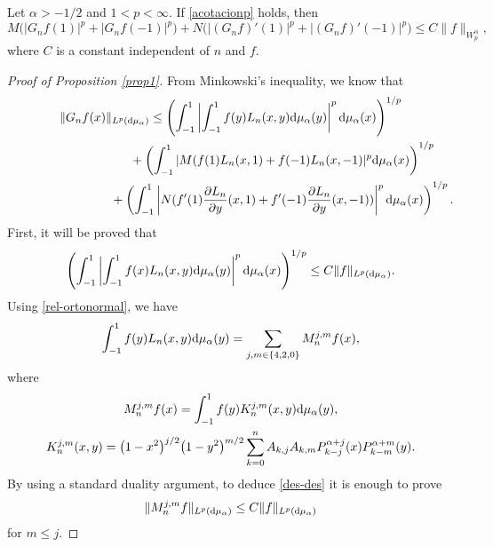 \begin{propo}\label{prop2} Let $\alpha>-1/2$ and $1<p<\infty$. If \eqref{acotacionp} holds, then
	\begin{equation*}
M\big(|G_nf(1)|^p+|G_nf(-1)|^p\big)+N\big(|(G_nf)'(1)|^p+|(G_nf)'(-1)|^p\big)\le C\|f\|_{W_p^{\alpha}},
	\end{equation*}
where $C$ is a constant independent of $n$ and $f$.
\end{propo}

\begin{proof}[Proof of Proposition \ref{prop1}] From Minkowski's inequality, we know that
	\begin{gather*}
	\|G_nf(x)\|_{L^p({\rm d}\mu_{\alpha})}\le
	\left(\int_{-1}^{1}\left|\int_{-1}^{1}f(y)L_n(x,y) {\rm d}{\mu_{\alpha}}(y)\right|^p {\rm d}\mu_{\alpha}(x)\right)^{1/p}\\
\hphantom{\|G_nf(x)\|_{L^p({\rm d}\mu_{\alpha})}\le}{}	+\left(\int_{-1}^{1}|M(f(1)L_n(x,1)+f(-1)L_n(x,-1)|^p {\rm d}\mu_{\alpha}(x)\right)^{1/p}\\
\hphantom{\|G_nf(x)\|_{L^p({\rm d}\mu_{\alpha})}\le}{}	+\left(\int_{-1}^{1}\left|N(f'(1)\frac{\partial L_n}{\partial y}(x,1)+f'(-1)\frac{\partial L_n}{\partial y}(x,-1))\right|^p {\rm d}\mu_{\alpha}(x)\right)^{1/p}.
	\end{gather*}	
First, it will be proved that
\begin{gather}\label{des-des}
\left(\int_{-1}^{1}\left|\int_{-1}^{1}f(x)L_n(x,y) {\rm d}\mu_{\alpha}(y)\right|^p {\rm d}\mu_{\alpha}(x)\right)^{1/p}\le C\|f\|_{L^p({\rm d}\mu_{\alpha})}.
	\end{gather}
Using \eqref{rel-ortonormal}, we have
	\begin{gather*}
	\int_{-1}^{1}f(y)L_n(x,y) {\rm d}\mu_{\alpha}(y)=\sum_{j,m\in \{4,2,0\}}M_n^{j,m}f(x),
	\end{gather*}
where
\begin{gather*}
M_n^{j,m}f(x)=\int_{-1}^{1} f(y) K_n^{j,m}(x,y) {\rm d}\mu_\alpha(y),\\
K_n^{j,m}(x,y)=\big(1-x^2\big)^{j/2}\big(1-y^2\big)^{m/2}\sum_{k=0}^{n}A_{k,j}A_{k,m}P_{k-j}^{\alpha+j}(x)P_{k-m}^{\alpha+m}(y).
\end{gather*}
By using a standard duality argument, to deduce \eqref{des-des} it is enough to prove
\begin{gather*}
\|M_n^{j,m}f\|_{L^p({\rm d}\mu_{\alpha})}\le C\|f\|_{L^p({\rm d}\mu_{\alpha})}
\end{gather*}
for $m\le j$.


\end{proof}
